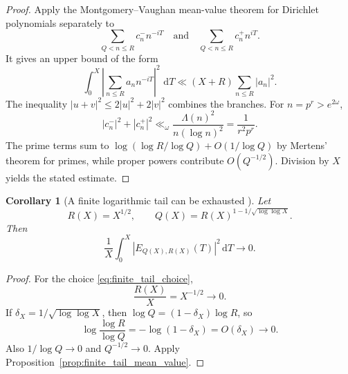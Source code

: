 \documentclass[11pt]{amsart}
\numberwithin{equation}{section}
\theoremstyle{plain}
\newtheorem{corollary}[theorem]{Corollary}
\theoremstyle{definition}
\theoremstyle{remark}
\newcommand{\1}{\mathbf{1}}
\newcommand{\dd}{\,\mathrm{d}}
\begin{document}
\begin{proof}
Apply the Montgomery--Vaughan mean-value theorem for Dirichlet polynomials
\cite[Chapter~7]{MontgomeryVaughan2007} separately to
\begin{equation}
\sum_{Q<n\leq R}c_n^-n^{-iT}
\quad\text{and}\quad
\sum_{Q<n\leq R}c_n^+n^{iT}.
\label{eq:MV_two_polynomials}
\end{equation}
It gives an upper bound of the form
\begin{equation}
\int_0^X\left|\sum_{n\leq R}a_nn^{-iT}\right|^2\,\dd T
\ll
(X+R)\sum_{n\leq R}|a_n|^2.
\label{eq:MV_mean_value_used}
\end{equation}
The inequality \(|u+v|^2\leq2|u|^2+2|v|^2\) combines the branches.  For
\(n=p^r>e^{2\omega}\),
\begin{equation}
|c_n^-|^2+|c_n^+|^2
\ll_\omega
\frac{\Lambda(n)^2}{n(\log n)^2}
=
\frac1{r^2p^r}.
\label{eq:finite_tail_coeff_square}
\end{equation}
The prime terms sum to
\(\log(\log R/\log Q)+O(1/\log Q)\) by Mertens' theorem for primes, while
proper powers contribute \(O(Q^{-1/2})\).  Division by \(X\) yields the
stated estimate.
\end{proof}


\begin{corollary}[A finite logarithmic tail can be exhausted {}]
\label{cor:finite_log_tail_exhaustion}
Let
\begin{equation}
R(X)=X^{1/2},
\qquad
Q(X)=R(X)^{1-1/\sqrt{\log\log X}}.
\label{eq:finite_tail_choice}
\end{equation}
Then
\begin{equation}
\frac1X\int_0^X|E_{Q(X),R(X)}(T)|^2\dd T
\longrightarrow0.
\label{eq:finite_tail_exhaustion}
\end{equation}
\end{corollary}

\begin{proof}
For the choice \eqref{eq:finite_tail_choice},
\begin{equation}
\frac{R(X)}{X}=X^{-1/2}\longrightarrow0.
\label{eq:finite_tail_RX}
\end{equation}
If \(\delta_X=1/\sqrt{\log\log X}\), then
\(\log Q=(1-\delta_X)\log R\), so
\begin{equation}
\log\frac{\log R}{\log Q}
=
-\log(1-\delta_X)
=
O(\delta_X)\longrightarrow0.
\label{eq:finite_tail_log_ratio}
\end{equation}
Also \(1/\log Q\to0\) and \(Q^{-1/2}\to0\).  Apply
Proposition~\ref{prop:finite_tail_mean_value}.
\end{proof}
\end{document}
